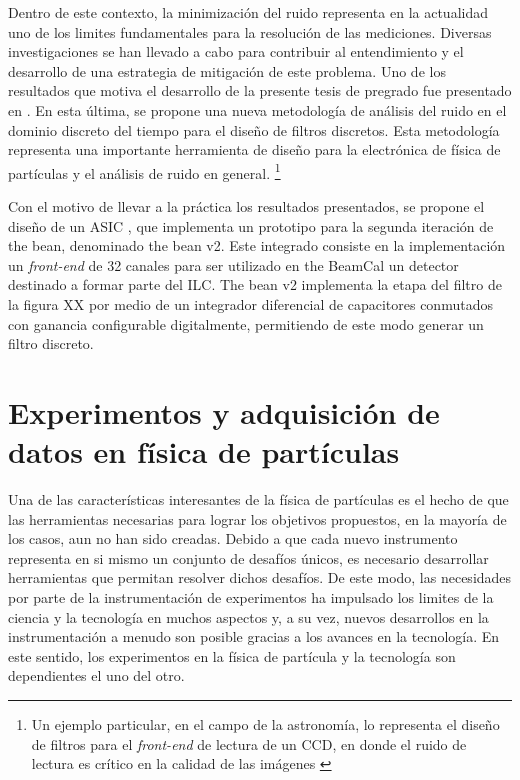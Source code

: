 Dentro de este contexto, la minimización del ruido representa en la actualidad uno de los limites fundamentales para la resolución de las mediciones. Diversas investigaciones se han llevado a cabo para contribuir al entendimiento y el desarrollo de una estrategia de mitigación de este problema. Uno de los resultados que motiva el desarrollo de la presente tesis de pregrado fue presentado en \citep{avila101}. En esta última, se propone una nueva metodología de análisis del ruido  en el dominio discreto del tiempo para el diseño de filtros discretos. Esta metodología representa una importante herramienta de diseño para la electrónica de física de partículas y el análisis de ruido en general. \footnote{ Un ejemplo particular, en el campo de la astronomía, lo representa el diseño de filtros para el \textit{front-end} de lectura de un CCD, en donde el ruido de lectura es crítico en la calidad de las imágenes  \citep{guzman101}}

Con el motivo de llevar a la práctica los resultados presentados, se propone el diseño de un ASIC \citep{diegothesis}, que implementa un prototipo para la segunda iteración de the bean, denominado the bean v2. Este integrado consiste en la implementación un \textit{front-end} de 32 canales para ser utilizado en the BeamCal un detector destinado a formar parte del ILC. The bean v2 implementa la etapa del filtro de la figura XX por medio de un integrador diferencial de capacitores conmutados con ganancia configurable digitalmente, permitiendo de este modo generar un filtro discreto.
 

\section{Experimentos y adquisición de datos en física de partículas}

Una de las características interesantes de la física de partículas es el hecho de que las herramientas necesarias para lograr los objetivos propuestos, en la mayoría de los casos, aun no han sido creadas. Debido a que cada nuevo instrumento representa en si mismo un conjunto de desafíos únicos, es necesario desarrollar herramientas que permitan resolver dichos desafíos. De este modo, las necesidades por parte de la instrumentación de experimentos ha impulsado los limites de la ciencia y la tecnología en muchos aspectos y, a su vez, nuevos desarrollos en la instrumentación a menudo son posible gracias a los avances en la tecnología.  En este sentido, los experimentos en la física de partícula y la tecnología son dependientes el uno del otro. \citep{Attila}

